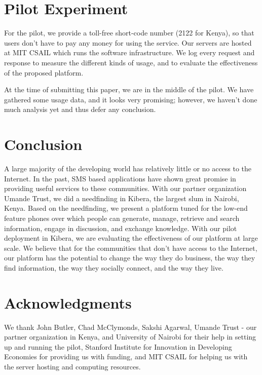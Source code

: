 \documentclass{chi-ext}
\begin{document}
\section{Pilot Experiment}
For the pilot, we provide a toll-free short-code number (2122  for Kenya), so that users don't have to pay any money for using the service. Our servers are hosted at MIT CSAIL which runs the software infrastructure. We log every request and response to measure the different kinds of usage, and to evaluate the effectiveness of the proposed platform.

At the time of submitting this paper, we are in the middle of the pilot. We have gathered some usage data, and it looks very promising; however, we haven't done much analysis yet and thus defer any conclusion.

\section{Conclusion}
A large majority of the developing world has relatively little or no access to the Internet. In the past, SMS based applications have shown great promise in providing useful services to these communities. With our partner organization Umande Trust, we did a needfinding in Kibera, the largest slum in Nairobi, Kenya. Based on the needfinding, we present a platform tuned for the low-end feature phones over which people can generate, manage, retrieve and search information, engage in discussion, and exchange knowledge. With our pilot deployment in Kibera, we are evaluating the effectiveness of our platform at large scale. We believe that for the communities that don't have access to the Internet, our platform has the potential to change the way they do business, the way they find information, the way they socially connect, and the way they live.


\section{Acknowledgments}
We thank John Butler, Chad McClymonds, Sakshi Agarwal, Umande Trust - our partner organization in Kenya, and University of Nairobi for their help in setting up and running the pilot, Stanford Institute for Innovation in Developing Economies for providing us with funding, and MIT CSAIL for helping us with the server hosting and computing resources.

\balance


\end{document}
